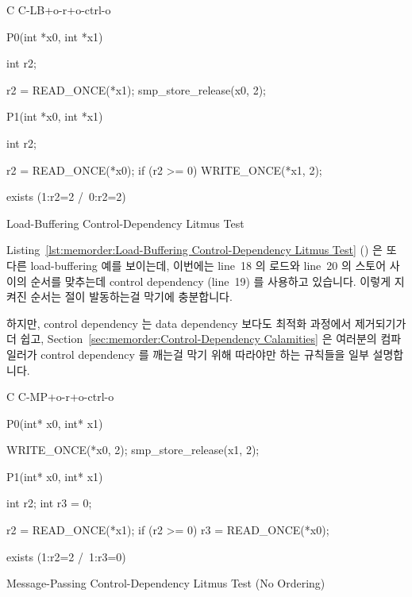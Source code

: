 \begin{listing}[tbp]
{ \scriptsize
\begin{verbbox}[\LstLineNo]
C C-LB+o-r+o-ctrl-o
{
}

P0(int *x0, int *x1)
{
  int r2;

  r2 = READ_ONCE(*x1);
  smp_store_release(x0, 2);
}


P1(int *x0, int *x1)
{
  int r2;

  r2 = READ_ONCE(*x0);
  if (r2 >= 0)
    WRITE_ONCE(*x1, 2);
}

exists (1:r2=2 /\ 0:r2=2)
\end{verbbox}
}
\centering
\theverbbox
\caption{Load-Buffering Control-Dependency Litmus Test}
\label{lst:memorder:Load-Buffering Control-Dependency Litmus Test}
\end{listing}

Listing~\ref{lst:memorder:Load-Buffering Control-Dependency Litmus Test}
()
은 또다른 load-buffering 예를 보이는데, 이번에는 line~18 의 로드와 line~20 의
스토어 사이의 순서를 맞추는데 control dependency (line~19) 를 사용하고
있습니다.
이렇게 지켜진 순서는  절이 발동하는걸 막기에 충분합니다.

하지만, control dependency 는 data dependency 보다도 최적화 과정에서 제거되기가 더 쉽고,
Section~\ref{sec:memorder:Control-Dependency Calamities}
은 여러분의 컴파일러가 control dependency 를 깨는걸 막기 위해 따라야만 하는
규칙들을 일부 설명합니다.

\begin{listing}[tbp]
{ \scriptsize
\begin{verbbox}[\LstLineNo]
C C-MP+o-r+o-ctrl-o

{
}

P0(int* x0, int* x1) {

  WRITE_ONCE(*x0, 2);
  smp_store_release(x1, 2);

}

P1(int* x0, int* x1) {
  int r2;
  int r3 = 0;

  r2 = READ_ONCE(*x1);
  if (r2 >= 0)
    r3 = READ_ONCE(*x0);

}

exists (1:r2=2 /\ 1:r3=0)
\end{verbbox}
}
\centering
\theverbbox
\caption{Message-Passing Control-Dependency Litmus Test (No Ordering)}
\label{lst:memorder:Message-Passing Control-Dependency Litmus Test (No Ordering)}
\end{listing}

